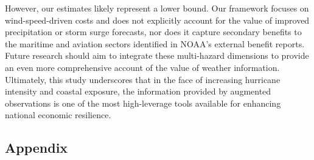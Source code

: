 \documentclass[12pt]{article}%
\begin{document}
However, our estimates likely represent a lower bound. Our framework focuses on wind-speed-driven costs and does not explicitly account for the value of improved precipitation or storm surge forecasts, nor does it capture secondary benefits to the maritime and aviation sectors identified in NOAA’s external benefit reports. Future research should aim to integrate these multi-hazard dimensions to provide an even more comprehensive account of the value of weather information. Ultimately, this study underscores that in the face of increasing hurricane intensity and coastal exposure, the information provided by augmented observations is one of the most high-leverage tools available for enhancing national economic resilience.


\FloatBarrier
\newpage
\begin{singlespace}

{}
\end{singlespace}
\FloatBarrier
\newpage
\appendix
\begin{Large}
\section*{Appendix}
\end{Large}

\setcounter{table}{0}
\renewcommand{\thetable}{A\arabic{table}}
\end{document}
